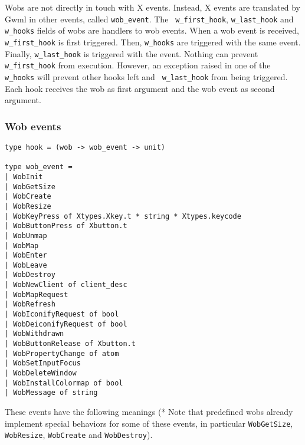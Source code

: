 \documentclass{book}
\begin{document}
 Wobs are not directly in touch with X events. Instead, X events are
translated by Gwml in other events, called {\tt wob\_event}. The {\tt
w\_first\_hook}, {\tt w\_last\_hook} and {\tt w\_hooks} fields of wobs are
handlers to wob events. When a wob event is received, {\tt w\_first\_hook}
is first triggered. Then, {\tt w\_hooks} are triggered with the same event.
Finally, {\tt w\_last\_hook} is triggered with the event. Nothing can
prevent {\tt w\_first\_hook} from execution. However, an exception raised
in one of the {\tt w\_hooks} will prevent other hooks left and {\tt
w\_last\_hook} from being triggered. Each hook receives the wob as first argument
and the wob event as second argument.

\subsubsection{Wob events}

\begin{verbatim}
type hook = (wob -> wob_event -> unit)

type wob_event =
| WobInit
| WobGetSize
| WobCreate
| WobResize
| WobKeyPress of Xtypes.Xkey.t * string * Xtypes.keycode
| WobButtonPress of Xbutton.t
| WobUnmap
| WobMap
| WobEnter
| WobLeave
| WobDestroy
| WobNewClient of client_desc
| WobMapRequest
| WobRefresh
| WobIconifyRequest of bool
| WobDeiconifyRequest of bool
| WobWithdrawn
| WobButtonRelease of Xbutton.t
| WobPropertyChange of atom
| WobSetInputFocus
| WobDeleteWindow
| WobInstallColormap of bool
| WobMessage of string
\end{verbatim}

These events have the following meanings (* Note that predefined wobs 
already implement special behaviors for some of these events, in particular
{\tt WobGetSize}, {\tt WobResize}, {\tt WobCreate} and {\tt WobDestroy}).
\end{document}
